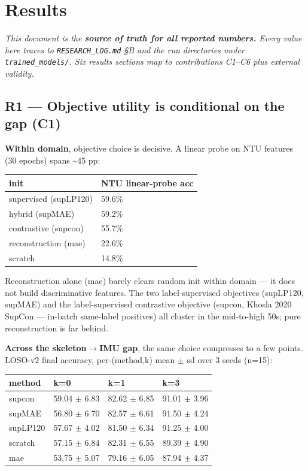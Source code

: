 \section{Results}

\textit{This document is the \textbf{source of truth for all reported numbers.} Every value here traces to \texttt{RESEARCH\_LOG.md} \S{}B and the run directories under \texttt{trained\_models/}. Six results sections map to contributions C1--C6 plus external validity.}

\subsection{R1 --- Objective utility is conditional on the gap (C1)}

\textbf{Within domain}, objective choice is decisive. A linear probe on NTU features (30 epochs) spans \textasciitilde{}45 pp:

\begin{center}
\small
\begin{tabular}{ll}
\toprule
init & NTU linear-probe acc \\
\midrule
supervised (supLP120) & 59.6\% \\
hybrid (supMAE) & 59.2\% \\
contrastive (supcon) & 55.7\% \\
reconstruction (mae) & 22.6\% \\
scratch & 14.8\% \\
\bottomrule
\end{tabular}
\end{center}

Reconstruction alone (mae) barely clears random init within domain --- it does not build discriminative features. The two label-supervised objectives (supLP120, supMAE) and the label-supervised contrastive objective (supcon, Khosla 2020 SupCon --- in-batch same-label positives) all cluster in the mid-to-high 50s; pure reconstruction is far behind.

\textbf{Across the skeleton$\rightarrow$IMU gap}, the same choice compresses to a few points. LOSO-v2 final accuracy, per-(method,k) mean $\pm$ sd over 3 seeds (n=15):

\begin{center}
\small
\begin{tabular}{llll}
\toprule
method & k=0 & k=1 & k=3 \\
\midrule
supcon & 59.04 $\pm$ 6.83 & 82.62 $\pm$ 6.85 & 91.01 $\pm$ 3.96 \\
supMAE & 56.80 $\pm$ 6.70 & 82.57 $\pm$ 6.61 & 91.50 $\pm$ 4.24 \\
supLP120 & 57.67 $\pm$ 4.02 & 81.50 $\pm$ 6.34 & 91.25 $\pm$ 4.00 \\
scratch & 57.15 $\pm$ 6.84 & 82.31 $\pm$ 6.55 & 89.39 $\pm$ 4.90 \\
mae & 53.75 $\pm$ 5.07 & 79.16 $\pm$ 6.05 & 87.94 $\pm$ 4.37 \\
\bottomrule
\end{tabular}
\end{center}

